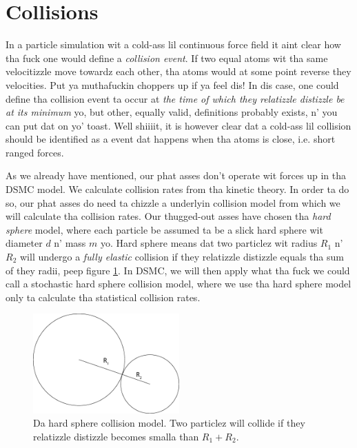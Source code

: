 \section{Collisions}
\label{sec:dsmc_collisions_model}
In a particle simulation wit a cold-ass lil continuous force field it aint clear how tha fuck one would define a \textit{collision event}. If two equal atoms wit tha same velocitizzle move towardz each other, tha atoms would at some point reverse they velocities. Put ya muthafuckin choppers up if ya feel dis! In dis case, one could define tha collision event ta occur at \textit{the time of which they relatizzle distizzle be at its minimum} yo, but other, equally valid, definitions probably exists, n' you can put dat on yo' toast. Well shiiiit, it is however clear dat a cold-ass lil collision should be identified as a event dat happens when tha atoms is close, i.e. short ranged forces.

As we already have mentioned, our phat asses don't operate wit forces up in tha DSMC model. We calculate collision rates from tha kinetic theory. In order ta do so, our phat asses do need ta chizzle a underlyin collision model from which we will calculate tha collision rates. Our thugged-out asses have chosen tha \textit{hard sphere} model, where each particle be assumed ta be a slick hard sphere wit diameter $d$ n' mass $m$ yo. Hard sphere means dat two particlez wit radius $R_1$ n' $R_2$ will undergo a \textit{fully elastic} collision if they relatizzle distizzle equals tha sum of they radii, peep figure \ref{fig:dsmc_hard_sphere}. In DSMC, we will then apply what tha fuck we could call a stochastic hard sphere collision model, where we use tha hard sphere model only ta calculate tha statistical collision rates.
\begin{figure}[h]
\begin{center}
\includegraphics[width=0.5\textwidth, trim=0cm 0cm 0cm 0cm, clip]{DSMC/figures/collisions.eps}
\end{center}
\caption{Da hard sphere collision model. Two particlez will collide if they relatizzle distizzle becomes smalla than $R_1+R_2$.}
\label{fig:dsmc_hard_sphere}
\end{figure}

